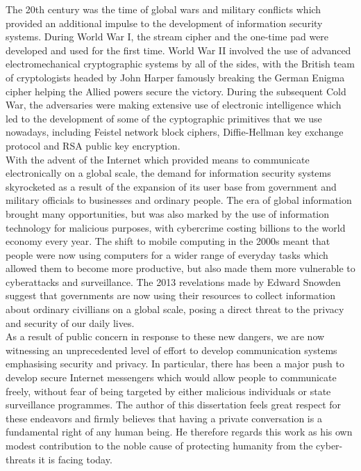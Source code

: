 \documentclass[a4paper, 12pt]{report}
\begin{document}
The 20th century was the time of global wars and military conflicts which provided an additional impulse to the development of information security systems. During World War I, the stream cipher and the one-time pad were developed and used for the first time. World War II involved the use of advanced electromechanical cryptographic systems by all of the sides, with the British team of cryptologists headed by John Harper famously breaking the German Enigma cipher helping the Allied powers secure the victory. During the subsequent Cold War, the adversaries were making extensive use of electronic intelligence which led to the development of some of the cyptographic primitives that we use nowadays, including Feistel network block ciphers, Diffie-Hellman key exchange protocol and RSA public key encryption. \\

With the advent of the Internet which provided means to communicate electronically on a global scale, the demand for information security systems skyrocketed as a result of the expansion of its user base from government and military officials to businesses and ordinary people. The era of global information brought many opportunities, but was also marked by the use of information technology for malicious purposes, with cybercrime costing billions to the world economy every year. The shift to mobile computing in the 2000s meant that people were now using computers for a wider range of everyday tasks which allowed them to become more productive, but also made them more vulnerable to cyberattacks and surveillance. The 2013 revelations made by Edward Snowden suggest that governments are now using their resources to collect information about ordinary civillians on a global scale, posing a direct threat to the privacy and security of our daily lives. \\

As a result of public concern in response to these new dangers, we are now witnessing an unprecedented level of effort to develop communication systems emphasising security and privacy. In particular, there has been a major push to develop secure Internet messengers which would allow people to communicate freely, without fear of being targeted by either malicious individuals or state surveillance programmes. The author of this dissertation feels great respect for these endeavors and firmly believes that having a private conversation is a fundamental right of any human being. He therefore regards this work as his own modest contribution to the noble cause of protecting humanity from the cyber-threats it is facing today.
\end{document}
